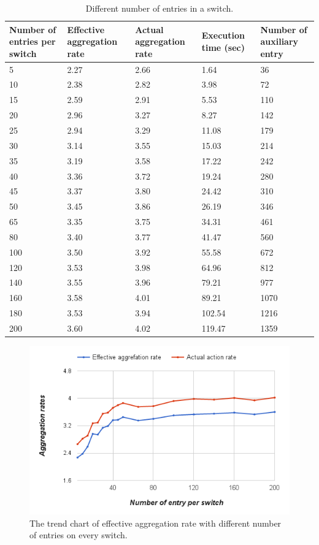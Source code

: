 \begin{table}
\centering
\caption{Different number of entries in a switch.}
\begin{tabular}{|l|p{2.6cm}|p{2.6cm}|p{1.9cm}|p{2.8cm}|}
\hline Number of entries per switch & Effective aggregation rate & Actual aggregation rate & Execution time (sec) & Number of auxiliary entry \\
\hline
\hline 5 & 2.27 & 2.66 & 1.64 & 36 \\
\hline 10 & 2.38 & 2.82 & 3.98 & 72 \\
\hline 15 & 2.59 & 2.91 & 5.53 & 110 \\
\hline 20 & 2.96 & 3.27 & 8.27 & 142 \\
\hline 25 & 2.94 & 3.29 & 11.08 & 179 \\
\hline 30 & 3.14 & 3.55 & 15.03 & 214 \\
\hline 35 & 3.19 & 3.58 & 17.22 & 242 \\
\hline 40 & 3.36 & 3.72 & 19.24 & 280 \\
\hline 45 & 3.37 & 3.80 & 24.42 & 310 \\
\hline 50 & 3.45 & 3.86 & 26.19 & 346 \\
\hline 65 & 3.35 & 3.75 & 34.31 & 461 \\
\hline 80 & 3.40 & 3.77 & 41.47 & 560 \\
\hline 100 & 3.50 & 3.92 & 55.58 & 672 \\
\hline 120 & 3.53 & 3.98 & 64.96 & 812 \\
\hline 140 & 3.55 & 3.96 & 79.21 & 977 \\
\hline 160 & 3.58 & 4.01 & 89.21 & 1070 \\
\hline 180 & 3.53 & 3.94 & 102.54 & 1216 \\
\hline 200 & 3.60 & 4.02 & 119.47 & 1359 \\
\hline 
\end{tabular}
\label{table:different_entry_per_switch}
\end{table}

\begin{figure}[H]
\begin{center} 
\includegraphics[width=1\textwidth]{figures/exp_entrynum_trend.png}
\end{center}
\caption{The trend chart of effective aggregation rate with different number of entries on every switch.}
\label{exp_entrynum_trend}
\end{figure}

